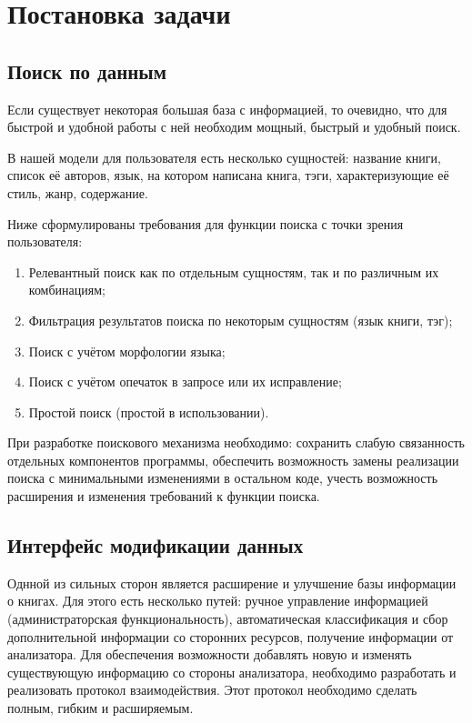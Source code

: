 
\section{Постановка задачи}

\subsection{Поиск по данным}

Если существует некоторая большая база с информацией, то очевидно, 
что для быстрой и удобной работы с ней необходим мощный, быстрый и удобный поиск.

В нашей модели для пользователя есть несколько сущностей: название книги, 
список её авторов, язык, на котором написана книга, тэги, характеризующие её стиль, жанр, содержание.

Ниже сформулированы требования для функции поиска с точки зрения пользователя:
\begin{enumerate}
  \item  Релевантный поиск как по отдельным сущностям, так и по различным их комбинациям;
  \item  Фильтрация результатов поиска по некоторым сущностям (язык книги, тэг);
  \item  Поиск с учётом морфологии языка;
  \item  Поиск с учётом опечаток в запросе или их исправление;
  \item  Простой поиск (простой в использовании).
\end{enumerate}

При разработке поискового механизма необходимо: сохранить слабую связанность отдельных компонентов программы, обеспечить возможность замены реализации поиска с минимальными изменениями в остальном коде, учесть возможность расширения и изменения требований к функции поиска.



\subsection{Интерфейс модификации данных}

Однной из сильных сторон является расширение и улучшение базы информации о книгах.
Для этого есть несколько путей: ручное управление информацией (администраторская функциональность), автоматическая классификация и сбор дополнительной информации со сторонних ресурсов, получение информации от анализатора.
Для обеспечения возможности добавлять новую и изменять существующую информацию со стороны анализатора, необходимо разработать и реализовать протокол взаимодействия.
Этот протокол необходимо сделать полным, гибким и расширяемым.
